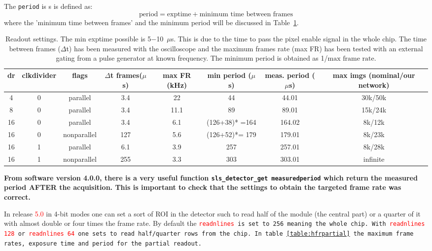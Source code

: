 \documentclass{article}
\begin{document}
{{{The {\tt{period}} is s is defined as:
\begin{equation} \label{period}
\textrm{period}  = \textrm{exptime} + \textrm{minimum time between frames}
\end{equation}
where the 'minimum time between frames' and the minimum period will be discussed in Table~\ref{tframes}.
\begin{tiny}
\begin{table}
\begin{flushleft}
\begin{tabular}{|c|c|c|c|c|c|c|c|}
\hline
\tiny{dr} & \tiny{clkdivider} & \tiny{flags} & \tiny{$\Delta$t frames($\mu$s) } &  \tiny{max FR (kHz)} & \tiny{min period ($\mu$s)} & \tiny{meas. period ($\mu$s)} & \tiny{max imgs (nominal/our network)}\\
\hline
4 & 0 & \tiny {parallel} & 3.4 & 22  & 44 & 44.01 & 30k/50k\\
\hline
\hline
8 & 0 & \tiny {parallel} & 3.4 & 11.1 & 89 & 89.01 & 15k/24k\\
\hline
16 & 0 & \tiny {parallel} & 3.4 & 6.1 & (126+38)* =164 & 164.02 & 8k/12k\\
\hline
16 & 0 & \tiny {nonparallel} &  127 & 5.6 & (126+52)*= 179 & 179.01& 8k/23k\\
\hline
16 & 1 & \tiny {parallel} &  6.1 & 3.9 &  257 & 257.01 & 8k/28k\\
\hline
16 & 1 & \tiny {nonparallel} & 255 & 3.3 &  303 & 303.01 & infinite\\
\hline
\end{tabular}
\caption{Readout settings. The {\tiny{min exptime}} possible is 5$-$10~$\mu$s. This is due to the time to pass the pixel enable signal in the whole chip. The time between frames ($\Delta$t) has been measured with the oscilloscope and the maximum frames rate (max FR) has been tested with an external gating from a pulse generator at known frequency. The minimum period is obtained as 1/$\textrm{max frame rate}$.}
\label{tframes}
\end{flushleft}
\end{table}
\end{tiny}

\textbf{From software version 4.0.0, there is a very useful function {\tt{sls\_detector\_get measuredperiod}} which return the measured period AFTER the acquisition. This is important to check that the settings to obtain the targeted frame rate was correct.} 

In release \textcolor{red}{5.0} in 4-bit modes one can set a sort of ROI in the detector such to read half of the module (the central part) or a quarter of it with almost double or four times the frame rate. By default the \tt{\textcolor{red}{readnlines}} is set to \tt{256} meaning the whole chip. With \tt{\textcolor{red}{readnlines 128}} or \tt{\textcolor{red}{readnlines 64}} one sets to read half/quarter rows from the chip. In table~\ref{table:hfrpartial} the maximum frame rates, exposure time and period for the partial readout.\\


}}}
\end{document}
